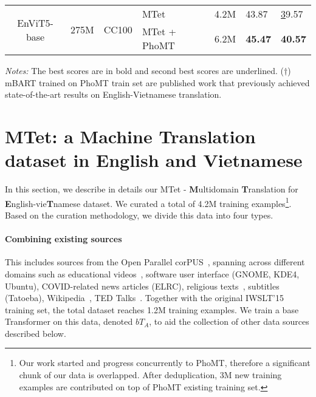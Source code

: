 \documentclass[11pt]{article}
\begin{document}
\begin{table*}[ht]
\begin{threeparttable}
\begin{tabular}{c|c|c|ll|l|l}
\multirow{2}{*}{EnViT5-base} & \multirow{2}{*}{275M}                            
                                                                           & \multirow{2}{*}{CC100}       & \multicolumn{1}{l|}{MTet}                 & 4.2M     & 43.87                                       & {\ul 39.57}                                \\ \cline{4-7} 
                             &                                                 &                              & \multicolumn{1}{l|}{MTet + PhoMT}         & 6.2M     & \textbf{45.47}                              & \textbf{40.57}                             \\ \hline
\end{tabular}
\begin{tablenotes}
      \small
      \item \textit{Notes:} The best scores are in bold and second best scores are underlined. (\textit{$\dagger$}) mBART trained on PhoMT train set are published work \cite{phomt} that previously achieved state-of-the-art results on English-Vietnamese translation. 
\end{tablenotes}
\end{threeparttable}

\label{phomt_results}
\end{table*} 


\section{MTet: a Machine Translation dataset in English and Vietnamese}
\label{data}
In this section, we describe in details our MTet - \textbf{M}ultidomain \textbf{T}ranslation for \textbf{E}nglish-vie\textbf{T}namese dataset. We curated a total of 4.2M training examples\footnote{Our work started and progress concurrently to PhoMT, therefore a significant chunk of our data is overlapped. After deduplication, 3M new training examples are contributed on top of PhoMT existing training set.}. 
Based on the curation methodology, we divide this data into four types.

\paragraph{Combining existing sources} This includes sources from the Open Parallel corPUS~\cite{TIEDEMANN12463}, spanning across different domains such as educational videos~\cite{abdelali-etal-2014-amara}, software user interface (GNOME, KDE4, Ubuntu), COVID-related news articles (ELRC), religious texts~\cite{christodouloupoulos2015massively}, subtitles (Tatoeba), Wikipedia~\cite{wolk2014building}, TED Talks~\cite{reimers-2020-multilingual-sentence-bert}. Together with the original IWSLT'15~\cite{iwslt2015} training set, the total dataset reaches 1.2M training examples. 
We train a base Transformer on this data, denoted $bT_A$, to aid the collection of other data sources described below.
\end{document}
